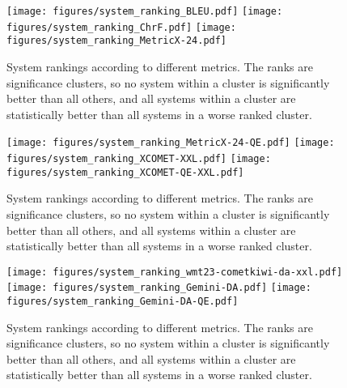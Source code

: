 \begin{figure*}
    \centering
    \texttt{[image: figures/system\_ranking\_BLEU.pdf]}
    \texttt{[image: figures/system\_ranking\_ChrF.pdf]}
    \texttt{[image: figures/system\_ranking\_MetricX-24.pdf]}

    \caption{System rankings according to different metrics.
    The ranks are significance clusters, so no system within a cluster is significantly better than all others, and all systems within a cluster are statistically better than all systems in a worse ranked cluster.}
    \label{fig:system_ranking_all_1}
\end{figure*}

\begin{figure*}
    \centering
    \texttt{[image: figures/system\_ranking\_MetricX-24-QE.pdf]}
    \texttt{[image: figures/system\_ranking\_XCOMET-XXL.pdf]}
    \texttt{[image: figures/system\_ranking\_XCOMET-QE-XXL.pdf]}

    \caption{System rankings according to different metrics.
    The ranks are significance clusters, so no system within a cluster is significantly better than all others, and all systems within a cluster are statistically better than all systems in a worse ranked cluster.}
    \label{fig:system_ranking_all_2}
\end{figure*}

\begin{figure*}
    \centering
    \texttt{[image: figures/system\_ranking\_wmt23-cometkiwi-da-xxl.pdf]}
    \texttt{[image: figures/system\_ranking\_Gemini-DA.pdf]}
    \texttt{[image: figures/system\_ranking\_Gemini-DA-QE.pdf]}
    \caption{System rankings according to different metrics.
    The ranks are significance clusters, so no system within a cluster is significantly better than all others, and all systems within a cluster are statistically better than all systems in a worse ranked cluster.}
    \label{fig:system_ranking_all_3}
\end{figure*}